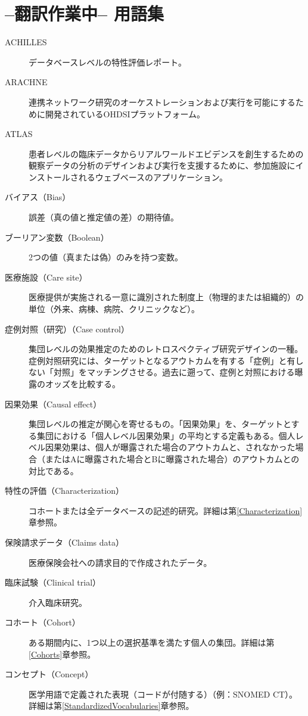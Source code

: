 \documentclass[
  11pt]{book}
\theoremstyle{definition}
\theoremstyle{definition}
\theoremstyle{definition}
\theoremstyle{definition}
\theoremstyle{remark}
\begin{document}
\appendix {}


\chapter{--翻訳作業中-- 用語集}\label{Glossary}

\begin{description}
\item[ACHILLES]
データベースレベルの特性評価レポート。
\item[ARACHNE]
連携ネットワーク研究のオーケストレーションおよび実行を可能にするために開発されているOHDSIプラットフォーム。
\item[ATLAS]
患者レベルの臨床データからリアルワールドエビデンスを創生するための観察データの分析のデザインおよび実行を支援するために、参加施設にインストールされるウェブベースのアプリケーション。
\item[バイアス（Bias）]
誤差（真の値と推定値の差）の期待値。
\item[ブーリアン変数（Boolean）]
2つの値（真または偽）のみを持つ変数。
\item[医療施設（Care site）]
医療提供が実施される一意に識別された制度上（物理的または組織的）の単位（外来、病棟、病院、クリニックなど）。
\item[症例対照（研究）（Case control）]
集団レベルの効果推定のためのレトロスペクティブ研究デザインの一種。症例対照研究には、ターゲットとなるアウトカムを有する「症例」と有しない「対照」をマッチングさせる。過去に遡って、症例と対照における曝露のオッズを比較する。
\item[因果効果（Causal effect）]
集団レベルの推定が関心を寄せるもの。「因果効果」を、ターゲットとする集団における「個人レベル因果効果」の平均とする定義もある。個人レベル因果効果は、個人が曝露された場合のアウトカムと、されなかった場合（またはAに曝露された場合とBに曝露された場合）のアウトカムとの対比である。
\item[特性の評価（Characterization）]
コホートまたは全データベースの記述的研究。詳細は第\ref{Characterization}章参照。
\item[保険請求データ（Claims data）]
医療保険会社への請求目的で作成されたデータ。
\item[臨床試験（Clinical trial）]
介入臨床研究。
\item[コホート（Cohort）]
ある期間内に、1つ以上の選択基準を満たす個人の集団。詳細は第\ref{Cohorts}章参照。
\item[コンセプト（Concept）]
医学用語で定義された表現（コードが付随する）（例：SNOMED CT）。詳細は第\ref{StandardizedVocabularies}章参照。

\end{description}
\end{document}
